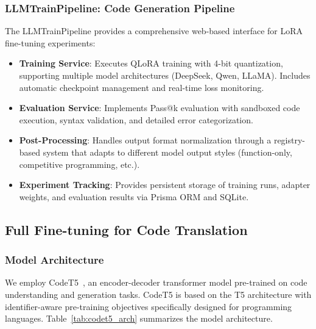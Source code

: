 \documentclass[conference]{IEEEtran}
\begin{document}
\subsubsection{LLMTrainPipeline: Code Generation Pipeline}
The LLMTrainPipeline provides a comprehensive web-based interface for LoRA fine-tuning experiments:

\begin{itemize}
    \item \textbf{Training Service}: Executes QLoRA training with 4-bit quantization, supporting multiple model architectures (DeepSeek, Qwen, LLaMA). Includes automatic checkpoint management and real-time loss monitoring.
    \item \textbf{Evaluation Service}: Implements Pass@k evaluation with sandboxed code execution, syntax validation, and detailed error categorization.
    \item \textbf{Post-Processing}: Handles output format normalization through a registry-based system that adapts to different model output styles (function-only, competitive programming, etc.).
    \item \textbf{Experiment Tracking}: Provides persistent storage of training runs, adapter weights, and evaluation results via Prisma ORM and SQLite.
\end{itemize}

\subsection{Full Fine-tuning for Code Translation}

\subsubsection{Model Architecture}
We employ CodeT5~\cite{wang2021codet5}, an encoder-decoder transformer model pre-trained on code understanding and generation tasks. CodeT5 is based on the T5 architecture with identifier-aware pre-training objectives specifically designed for programming languages. Table~\ref{tab:codet5_arch} summarizes the model architecture.
\end{document}
